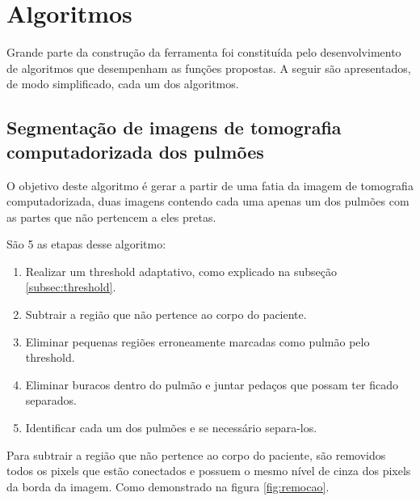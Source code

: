 \section{Algoritmos}

Grande   parte  da   construção    da  ferramenta    foi constituída pelo desenvolvimento de algoritmos que desempenham as funções propostas. A seguir são apresentados, de modo simplificado, cada um dos algoritmos.

\subsection{Segmentação de imagens de tomografia computadorizada dos pulmões}

O objetivo deste algoritmo é gerar a partir de uma fatia da imagem de tomografia computadorizada, duas imagens contendo cada uma apenas um dos pulmões com as partes que não pertencem a eles pretas.


São 5 as etapas desse algoritmo:
\begin{enumerate}
 \item Realizar um threshold adaptativo, como explicado na subseção \ref{subsec:threshold}.
 \item Subtrair a região que não pertence ao corpo do paciente.
 \item Eliminar pequenas regiões erroneamente marcadas como pulmão pelo threshold.
 \item Eliminar buracos dentro do pulmão e juntar pedaços que possam ter ficado separados.
 \item Identificar cada um dos pulmões e se necessário separa-los.
\end{enumerate}

Para subtrair a região que não pertence ao corpo do paciente, são removidos todos os pixels que estão conectados e possuem o mesmo nível de cinza dos pixels da borda da imagem. Como demonstrado na figura \ref{fig:remocao}.

